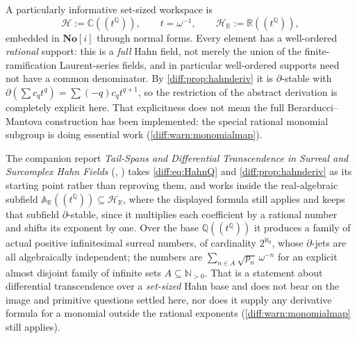 \documentclass[11pt,letterpaper]{article}
\numberwithin{equation}{section}
\theoremstyle{definition}
\theoremstyle{remark}
\newcommand{\SC}{\mathbf{No}[i]}
\newcommand{\R}{\mathbb R}
\newcommand{\C}{\mathbb C}
\newcommand{\Q}{\mathbb Q}
\newcommand{\N}{\mathbb N}
\newcommand{\der}{\partial}
\newcommand{\Hring}{\mathscr H}
\begin{document}
A particularly informative set-sized workspace is
\begin{equation}\label{diff:eq:HahnQ}
 \Hring:=\C((t^{\Q})),\qquad t=\omega^{-1},
 \qquad \Hring_{\R}:=\R((t^{\Q})),
\end{equation}
embedded in $\SC$ through normal forms. Every element has a well-ordered
\emph{rational} support: this is a \emph{full} Hahn field, not merely the union
of the finite-ramification Laurent-series fields, and in particular
well-ordered supports need not have a common denominator. By
\cref{diff:prop:hahnderiv} it is $\der$-stable with
$\der(\sum c_{q}t^{q})=\sum(-q)c_{q}t^{q+1}$, so the restriction of the
abstract derivation is completely explicit here. That explicitness does not
mean the full Berarducci--Mantova construction has been implemented: the
special rational monomial subgroup is doing essential work
(\cref{diff:warn:monomialmap}).

\begin{remark}
\label{diff:rem:tailspans}
The companion report \emph{Tail-Spans and Differential Transcendence in
Surreal and Surcomplex Hahn Fields}
(,
\cite{RepoTailSpans}) takes \cref{diff:eq:HahnQ} and
\cref{diff:prop:hahnderiv} as its starting point rather than reproving
them, and works inside the real-algebraic subfield
$\mathbb A_{\R}((t^{\Q}))\subseteq\Hring_{\R}$, where the displayed
formula still applies and keeps that subfield $\der$-stable, since it
multiplies each coefficient by a rational number and shifts its exponent
by one. Over the base $\Q((t^{\Q}))$ it produces a family of actual
positive infinitesimal surreal numbers, of cardinality $2^{\aleph_{0}}$,
whose $\der$-jets are all algebraically independent; the numbers are
$\sum_{n\in A}\sqrt{p_{n}}\,\omega^{-n}$ for an explicit almost disjoint
family of infinite sets $A\subseteq\N_{>0}$. That is a statement about
differential transcendence over a \emph{set-sized} Hahn base and does not
bear on the image and primitive questions settled here, nor does it supply
any derivative formula for a monomial outside the rational exponents
(\cref{diff:warn:monomialmap} still applies).
\end{remark}
\end{document}
